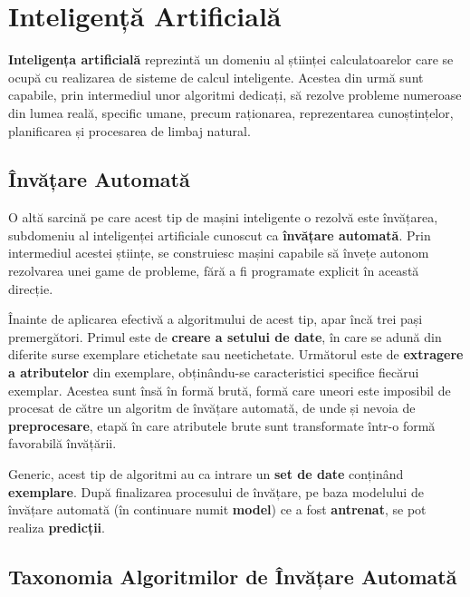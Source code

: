 \documentclass[../../main.tex]{subfiles}
\begin{document}
\vspace{0.3cm}

\vspace{0.3cm}

\vspace{0.3cm}
\newpage

\section{Inteligență Artificială}
\label{sec:theory_ai}

\textbf{Inteligența artificială} reprezintă un domeniu al științei calculatoarelor care se ocupă cu realizarea de sisteme de calcul inteligente. Acestea din urmă sunt capabile, prin intermediul unor algoritmi dedicați, să rezolve probleme numeroase din lumea reală, specific umane, precum raționarea, reprezentarea cunoștințelor, planificarea și procesarea de limbaj natural.

\subsection{Învățare Automată}

O altă sarcină pe care acest tip de mașini inteligente o rezolvă este învățarea, subdomeniu al inteligenței artificiale cunoscut ca \textbf{învățare automată}. Prin intermediul acestei științe, se construiesc mașini capabile să învețe autonom rezolvarea unei game de probleme, fără a fi programate explicit în această direcție.

Înainte de aplicarea efectivă a algoritmului de acest tip, apar încă trei pași premergători. Primul este de \textbf{creare a setului de date}, în care se adună din diferite surse exemplare etichetate sau neetichetate. Următorul este de \textbf{extragere a atributelor} din exemplare, obținându-se caracteristici specifice fiecărui exemplar. Acestea sunt însă în formă brută, formă care uneori este imposibil de procesat de către un algoritm de învățare automată, de unde și nevoia de \textbf{preprocesare}, etapă în care atributele brute sunt transformate într-o formă favorabilă învățării.

Generic, acest tip de algoritmi au ca intrare un \textbf{set de date} conținând \textbf{exemplare}. După finalizarea procesului de învățare, pe baza modelului de învățare automată (în continuare numit \textbf{model}) ce a fost \textbf{antrenat}, se pot realiza \textbf{predicții}.

\subsection{Taxonomia Algoritmilor de Învățare Automată}
\end{document}
